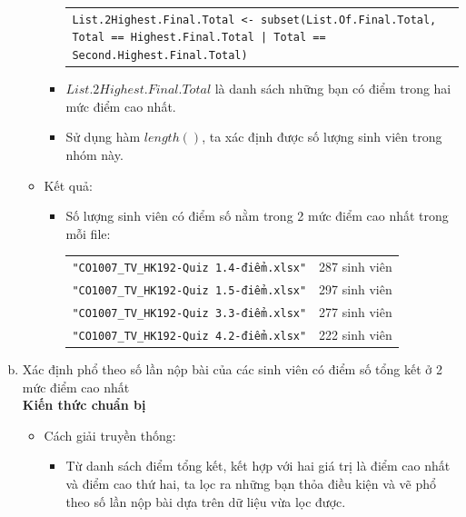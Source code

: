 \documentclass[a4paper]{article}
\theoremstyle{definition}
\begin{document}
\begin{enumerate}[a)]
\begin{itemize}
\begin{itemize}
            \begin{center}
                \begin{tabular}{p{13cm}}
                    \texttt{List.2Highest.Final.Total <- subset(List.Of.Final.Total, Total == Highest.Final.Total | Total == Second.Highest.Final.Total)}
                \end{tabular}
            \end{center}
            \item $List.2Highest.Final.Total$ là danh sách những bạn có điểm trong hai mức điểm cao nhất. 
            \item Sử dụng hàm $length()$, ta xác định được số lượng sinh viên trong nhóm này.
        \end{itemize}
        \item Kết quả:
        \begin{itemize}
            \item Số lượng sinh viên có điểm số nằm trong 2 mức điểm cao nhất trong mỗi file:
            \begin{center}
                \begin{tabular}{l c}
                     \texttt{"CO1007\_TV\_HK192-Quiz 1.4-điểm.xlsx"} & 287 sinh viên\\
                     \texttt{"CO1007\_TV\_HK192-Quiz 1.5-điểm.xlsx"} & 297 sinh viên\\
                     \texttt{"CO1007\_TV\_HK192-Quiz 3.3-điểm.xlsx"} & 277 sinh viên\\
                     \texttt{"CO1007\_TV\_HK192-Quiz 4.2-điểm.xlsx"} & 222 sinh viên
                \end{tabular}
            \end{center}
        \end{itemize}
    \end{itemize}
    \bf\item {Xác định phổ theo số lần nộp bài của các sinh viên có điểm số tổng kết ở 2 mức điểm cao nhất}\\[6pt]
    \bf Kiến thức chuẩn bị\normalfont
    \begin{itemize}
        \item Cách giải truyền thống:
        \begin{itemize}
            \item Từ danh sách điểm tổng kết, kết hợp với hai giá trị là điểm cao nhất và điểm cao thứ hai, ta lọc ra những bạn thỏa điều kiện và vẽ phổ theo số lần nộp bài dựa trên dữ liệu vừa lọc được.
        \end{itemize}

\end{itemize}
\end{enumerate}
\end{document}
